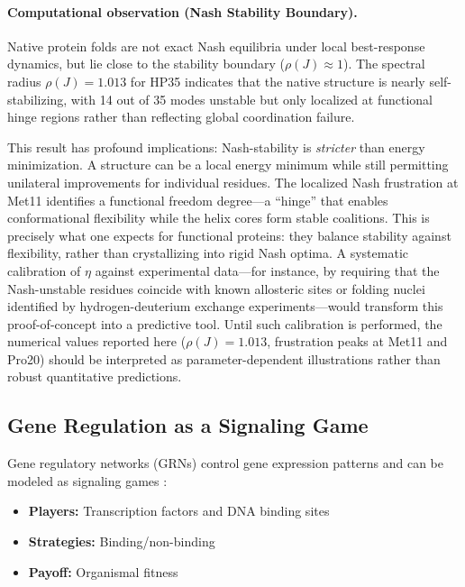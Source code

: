 \documentclass[12pt,a4paper]{article}
\theoremstyle{remark}
\begin{document}
\paragraph{Computational observation (Nash Stability Boundary).}
Native protein folds are not exact Nash equilibria under local best-response dynamics, but lie close to the stability boundary ($\rho(J) \approx 1$). The spectral radius $\rho(J) = 1.013$ for HP35 indicates that the native structure is nearly self-stabilizing, with 14 out of 35 modes unstable but only localized at functional hinge regions rather than reflecting global coordination failure.

This result has profound implications: Nash-stability is \textit{stricter} than energy minimization. A structure can be a local energy minimum while still permitting unilateral improvements for individual residues. The localized Nash frustration at Met11 identifies a functional freedom degree---a ``hinge'' that enables conformational flexibility while the helix cores form stable coalitions. This is precisely what one expects for functional proteins: they balance stability against flexibility, rather than crystallizing into rigid Nash optima. A systematic calibration of $\eta$ against experimental data---for instance, by requiring that the Nash-unstable residues coincide with known allosteric sites or folding nuclei identified by hydrogen-deuterium exchange experiments---would transform this proof-of-concept into a predictive tool. Until such calibration is performed, the numerical values reported here ($\rho(J) = 1.013$, frustration peaks at Met11 and Pro20) should be interpreted as parameter-dependent illustrations rather than robust quantitative predictions.

\subsection{Gene Regulation as a Signaling Game}

Gene regulatory networks (GRNs) control gene expression patterns and can be modeled as signaling games \citep{PredatorPreyESS}:

\begin{itemize}
    \item \textbf{Players:} Transcription factors and DNA binding sites
    \item \textbf{Strategies:} Binding/non-binding
    \item \textbf{Payoff:} Organismal fitness
\end{itemize}
\end{document}
